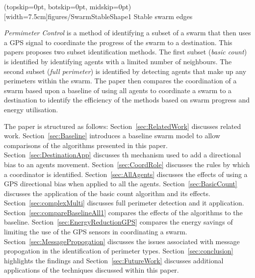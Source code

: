 \documentclass{ieeeaccess}
\begin{document}
\Figure[t!](topskip=0pt, botskip=0pt, midskip=0pt)[width=7.5cm]{figures/SwarmStableShape1}
{Stable swarm edges\label{concave:SwarmStableShape1}}

\textit{Permimeter Control} is a method of identifying a subset of a swarm that then uses a GPS signal to coordinate the progress of the swarm to a destination. This papers proposes two subset identification methods. The first subset (\textit{basic count}) is identified by identifying agents with a limited number of neighbours. The second subset (\textit{full perimeter}) is identified by detecting agents that make up any perimeters within the swarm. The paper then compares the coordination of a swarm based upon a baseline of using all agents to coordinate a swarm to a destination to identify the efficiency of the methods based on swarm progress and energy utilisation.

The paper is structured as follows: Section~\ref{sec:RelatedWork} discusses related work. Section~\ref{sec:Baseline} introduces a baseline swarm model to allow comparisons of the algorithms presented in this paper. Section~\ref{sec:DestinationApp} discusses th mechanism used to add a directional bias to an agents movement. Section~\ref{sec:CoordRole} discusses the rules by which a coordinator is identified. Section~\ref{sec:AllAgents} discusses the effects of using a GPS directional bias when applied to all the agents. Section~\ref{sec:BasicCount} discusses the application of the basic count algorithm and its effects. Section~\ref{sec:complexMulti}
discusses full perimeter detection and it application. Section~\ref{sec:compareBaselineAll1} compares the effects of the algorithms to the baseline. Section~\ref{sec:EnergyReductionGPS} compares the energy savings of limiting the use of the GPS sensors in coordinating a swarm. Section~\ref{sec:MessagePropogation} discusses the issues associated with message propogation in the identification of perimeter types. Section~\ref{sec:conclusion} highlights the findings and Section~\ref{sec:FutureWork} discusses additional applications of the techniques discussed within this paper.
\end{document}
